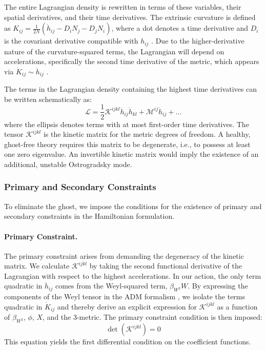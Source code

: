 \documentclass[twocolumn]{aastex631}
\begin{document}
The entire Lagrangian density is rewritten in terms of these variables, their spatial derivatives, and their time derivatives. The extrinsic curvature is defined as $K_{ij} = \frac{1}{2N}(\dot{h}_{ij} - D_i N_j - D_j N_i)$, where a dot denotes a time derivative and $D_i$ is the covariant derivative compatible with $h_{ij}$ \citep{vinckers2024numericalsolutionsfrkleingordon}. Due to the higher-derivative nature of the curvature-squared terms, the Lagrangian will depend on accelerations, specifically the second time derivative of the metric, which appears via $\dot{K}_{ij} \sim \ddot{h}_{ij}$ \citep{brown2011generalizedharmonicequations31}.

The terms in the Lagrangian density containing the highest time derivatives can be written schematically as:
\begin{equation}
\mathcal{L} = \frac{1}{2} \mathcal{K}^{ijkl} \ddot{h}_{ij} \ddot{h}_{kl} + \mathcal{M}^{ij} \ddot{h}_{ij} + \dots
\end{equation}
where the ellipsis denotes terms with at most first-order time derivatives. The tensor $\mathcal{K}^{ijkl}$ is the kinetic matrix for the metric degrees of freedom. A healthy, ghost-free theory requires this matrix to be degenerate, i.e., to possess at least one zero eigenvalue. An invertible kinetic matrix would imply the existence of an additional, unstable Ostrogradsky mode.

\subsubsection{Primary and Secondary Constraints}
To eliminate the ghost, we impose the conditions for the existence of primary and secondary constraints in the Hamiltonian formulation. \citep{wipf1993hamiltonsformalismsystemsconstraints,dolan2021constraineddynamicshamiltonianformalism,kaltsas2025constrainedhamiltoniansystemsphysicsinformed}

\paragraph{Primary Constraint.} The primary constraint arises from demanding the degeneracy of the kinetic matrix. We calculate $\mathcal{K}^{ijkl}$ by taking the second functional derivative of the Lagrangian with respect to the highest accelerations. In our action, the only term quadratic in $\ddot{h}_{ij}$ comes from the Weyl-squared term, $\beta_{W^2} W$. By expressing the components of the Weyl tensor in the ADM formalism \citep{watson2025intrinsiccoordinatereferenceframe,watson2025intrinsiccoordinatereferenceframe}, we isolate the terms quadratic in $\dot{K}_{ij}$ and thereby derive an explicit expression for $\mathcal{K}^{ijkl}$ as a function of $\beta_{W^2}$, $\phi$, $X$, and the 3-metric. The primary constraint condition is then imposed:
\begin{equation}
\det(\mathcal{K}^{ijkl}) = 0
\end{equation}
This equation yields the first differential condition on the coefficient functions.
\end{document}

